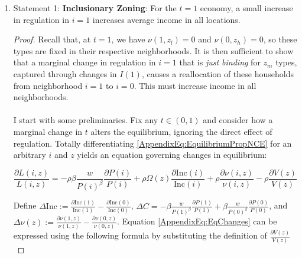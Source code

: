 \documentclass[12pt]{article}
\begin{document}
\begin{enumerate}
		 
		
		\item Statement 1: \textbf{Inclusionary Zoning}: For the $t = 1$ economy, a small increase in regulation in $i = 1$ increases average income in all locations.
		
		\begin{proof}
		Recall that, at $t = 1$, we have $\nu(1, z_{l}) = 0$ and $\nu(0, z_{h}) = 0$, so these types are fixed in their respective neighborhoods. It is then sufficient to show that a marginal change in regulation in $i = 1$ that is \textit{just binding} for $z_{m}$ types, captured through changes in $I(1)$, causes a reallocation of these households from neighborhood $i = 1$ to $i = 0$. This must increase income in all neighborhoods. 
		
		\paragraph*{} I start with some preliminaries. Fix any $t \in (0, 1)$ and consider how a marginal change in $t$ alters the equilibrium, ignoring the direct effect of regulation. Totally differentiating \eqref{AppendixEq:EquilibriumPropNCE} for an arbitrary $i$ and $z$ yields an equation governing changes in equilibrium:
		
		 \begin{equation}\label{AppendixEq:EqChanges}
			 	 \frac{\partial L(i, z)}{L(i, z)} = -\rho \beta \frac{w}{P(i)^{\beta}}\frac{\partial P(i)}{P(i)} + \rho\Omega(z) \frac{\partial \text{Inc}(i)}{\text{Inc}(i)} + \rho\frac{\partial \nu(i, z)}{\nu(i, z)}  - \rho \frac{\partial V(z)}{V(z)}
		 \end{equation}
		
		 Define $\Delta \text{Inc} := \frac{\partial \text{Inc}(1)}{\text{Inc}(1)} - \frac{\partial \text{Inc}(0)}{\text{Inc}(0)}$, $\Delta C = -\beta\frac{w}{P(1)^{\beta}}\frac{\partial P(1)}{P(1)} + \beta\frac{w}{P(0)^{\beta}}\frac{\partial P(0)}{P(0)}$, and $\Delta \nu(z) := \frac{\partial \nu(1, z)}{\nu(1, z)} - \frac{\partial \nu(0, z)}{\nu(0, z)}$. Equation \eqref{AppendixEq:EqChanges} can be expressed using the following formula by substituting the definition of $\frac{\partial V(z)}{V(z)}$
		

\end{proof}
\end{enumerate}
\end{document}
